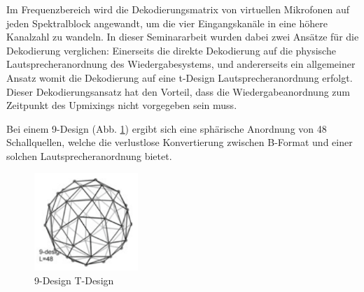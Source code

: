 


Im Frequenzbereich wird die Dekodierungsmatrix von virtuellen Mikrofonen auf jeden Spektralblock angewandt, um die vier Eingangskanäle in eine höhere Kanalzahl zu wandeln. In dieser Seminararbeit wurden dabei zwei Ansätze für die Dekodierung verglichen: Einerseits die direkte Dekodierung auf die physische Lautsprecheranordnung des Wiedergabesystems, und andererseits ein allgemeiner Ansatz womit die Dekodierung auf eine t-Design Lautsprecheranordnung erfolgt. Dieser Dekodierungsansatz hat den Vorteil, dass die Wiedergabeanordnung zum Zeitpunkt des Upmixings nicht vorgegeben sein muss.

Bei einem 9-Design (Abb. \ref{fig:tdesign_image}) ergibt sich eine sphärische Anordnung von 48 Schallquellen, welche die verlustlose Konvertierung zwischen B-Format und einer solchen Lautsprecheranordnung bietet.

\begin{figure}[!ht]
  \centering
  \includegraphics[width=0.35\textwidth]{implementierung/plots/t-design.png}
  \caption{9-Design T-Design \cite{ambi-book}}
  \label{fig:tdesign_image}
\end{figure}

